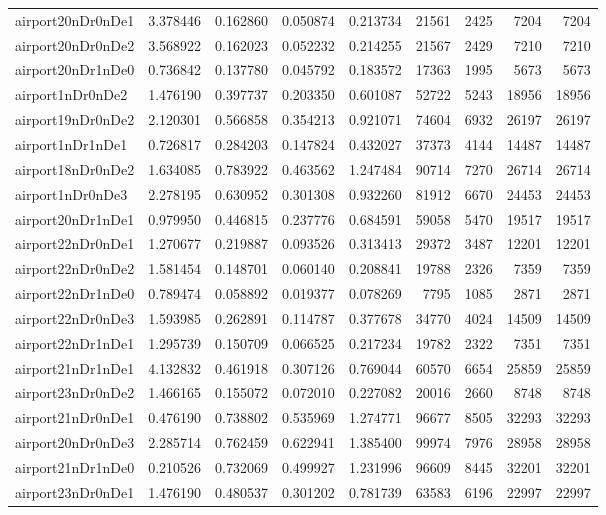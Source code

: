 \documentclass[../../../thesis.tex]{subfiles}
\begin{document}
\begin{longtable}{|l|r|r|r|r|r|r|r|r|}
airport20nDr0nDe1 & 3.378446 & 0.162860 & 0.050874 & 0.213734 & 21561 & 2425 & 7204 & 7204 \\
airport20nDr0nDe2 & 3.568922 & 0.162023 & 0.052232 & 0.214255 & 21567 & 2429 & 7210 & 7210 \\
airport20nDr1nDe0 & 0.736842 & 0.137780 & 0.045792 & 0.183572 & 17363 & 1995 & 5673 & 5673 \\
airport1nDr0nDe2 & 1.476190 & 0.397737 & 0.203350 & 0.601087 & 52722 & 5243 & 18956 & 18956 \\
airport19nDr0nDe2 & 2.120301 & 0.566858 & 0.354213 & 0.921071 & 74604 & 6932 & 26197 & 26197 \\
airport1nDr1nDe1 & 0.726817 & 0.284203 & 0.147824 & 0.432027 & 37373 & 4144 & 14487 & 14487 \\
airport18nDr0nDe2 & 1.634085 & 0.783922 & 0.463562 & 1.247484 & 90714 & 7270 & 26714 & 26714 \\
airport1nDr0nDe3 & 2.278195 & 0.630952 & 0.301308 & 0.932260 & 81912 & 6670 & 24453 & 24453 \\
airport20nDr1nDe1 & 0.979950 & 0.446815 & 0.237776 & 0.684591 & 59058 & 5470 & 19517 & 19517 \\
airport22nDr0nDe1 & 1.270677 & 0.219887 & 0.093526 & 0.313413 & 29372 & 3487 & 12201 & 12201 \\
airport22nDr0nDe2 & 1.581454 & 0.148701 & 0.060140 & 0.208841 & 19788 & 2326 & 7359 & 7359 \\
airport22nDr1nDe0 & 0.789474 & 0.058892 & 0.019377 & 0.078269 & 7795 & 1085 & 2871 & 2871 \\
airport22nDr0nDe3 & 1.593985 & 0.262891 & 0.114787 & 0.377678 & 34770 & 4024 & 14509 & 14509 \\
airport22nDr1nDe1 & 1.295739 & 0.150709 & 0.066525 & 0.217234 & 19782 & 2322 & 7351 & 7351 \\
airport21nDr1nDe1 & 4.132832 & 0.461918 & 0.307126 & 0.769044 & 60570 & 6654 & 25859 & 25859 \\
airport23nDr0nDe2 & 1.466165 & 0.155072 & 0.072010 & 0.227082 & 20016 & 2660 & 8748 & 8748 \\
airport21nDr0nDe1 & 0.476190 & 0.738802 & 0.535969 & 1.274771 & 96677 & 8505 & 32293 & 32293 \\
airport20nDr0nDe3 & 2.285714 & 0.762459 & 0.622941 & 1.385400 & 99974 & 7976 & 28958 & 28958 \\
airport21nDr1nDe0 & 0.210526 & 0.732069 & 0.499927 & 1.231996 & 96609 & 8445 & 32201 & 32201 \\
airport23nDr0nDe1 & 1.476190 & 0.480537 & 0.301202 & 0.781739 & 63583 & 6196 & 22997 & 22997 \\

\end{longtable}
\end{document}
